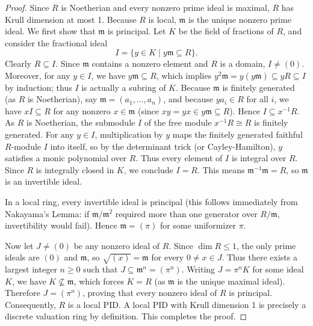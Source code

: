 \begin{proof}
    Since $R$ is Noetherian and every nonzero prime ideal is maximal, $R$ has Krull dimension at most 1. Because $R$ is local, $\mathfrak{m}$ is the unique nonzero prime ideal. We first show that $\mathfrak{m}$ is principal. Let $K$ be the field of fractions of $R$, and consider the fractional ideal
    \[
        I = \{ y \in K \mid y\mathfrak{m} \subseteq R \}.
    \]
    Clearly $R \subseteq I$. Since $\mathfrak{m}$ contains a nonzero element and $R$ is a domain, $I \neq (0)$. Moreover, for any $y \in I$, we have $y\mathfrak{m} \subseteq R$, which implies $y^2\mathfrak{m} = y(y\mathfrak{m}) \subseteq yR \subseteq I$ by induction; thus $I$ is actually a subring of $K$. Because $\mathfrak{m}$ is finitely generated (as $R$ is Noetherian), say $\mathfrak{m} = (a_1, \dots, a_n)$, and because $y a_i \in R$ for all $i$, we have $xI \subseteq R$ for any nonzero $x \in \mathfrak{m}$ (since $xy = yx \in y\mathfrak{m} \subseteq R$). Hence $I \subseteq x^{-1}R$. As $R$ is Noetherian, the submodule $I$ of the free module $x^{-1}R \cong R$ is finitely generated. For any $y \in I$, multiplication by $y$ maps the finitely generated faithful $R$-module $I$ into itself, so by the determinant trick (or Cayley-Hamilton), $y$ satisfies a monic polynomial over $R$. Thus every element of $I$ is integral over $R$. Since $R$ is integrally closed in $K$, we conclude $I = R$. This means $\mathfrak{m}^{-1}\mathfrak{m} = R$, so $\mathfrak{m}$ is an invertible ideal.
    
    In a local ring, every invertible ideal is principal (this follows immediately from Nakayama's Lemma: if $\mathfrak{m}/\mathfrak{m}^2$ required more than one generator over $R/\mathfrak{m}$, invertibility would fail). Hence $\mathfrak{m} = (\pi)$ for some uniformizer $\pi$. 
    
    Now let $J \neq (0)$ be any nonzero ideal of $R$. Since $\dim R \leq 1$, the only prime ideals are $(0)$ and $\mathfrak{m}$, so $\sqrt{(x)} = \mathfrak{m}$ for every $0 \neq x \in J$. Thus there exists a largest integer $n \geq 0$ such that $J \subseteq \mathfrak{m}^n = (\pi^n)$. Writing $J = \pi^n K$ for some ideal $K$, we have $K \not\subseteq \mathfrak{m}$, which forces $K = R$ (as $\mathfrak{m}$ is the unique maximal ideal). Therefore $J = (\pi^n)$, proving that every nonzero ideal of $R$ is principal. Consequently, $R$ is a local PID. A local PID with Krull dimension 1 is precisely a discrete valuation ring by definition. This completes the proof.

\end{proof}
